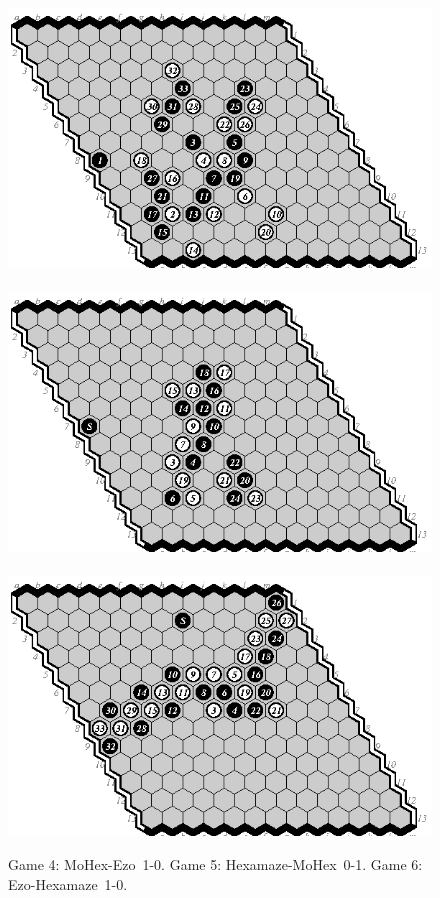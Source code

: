 \documentclass{icga}
\def\Eo{\mbox{\sc Ezo}}
\def\Hz{\mbox{\sc Hexamaze}}
\def\Mx{\mbox{\sc MoHex}}
\begin{document}
\begin{figure}[hbp]
\hspace*{-2cm}\
\includegraphics[scale=1.1]{games/pix/13-04-me-1-0.eps}\hspace*{-2cm}\
\includegraphics[scale=1.1]{games/pix/13-05-hm-0-1.eps}\hspace*{-2cm}\
\includegraphics[scale=1.1]{games/pix/13-06-eh-1-0.eps}
\caption{Game 4: \Mx-\Eo\ 1-0. Game 5: \Hz-\Mx\ 0-1. Game 6: \Eo-\Hz\ 1-0.}
\end{figure}
\end{document}
